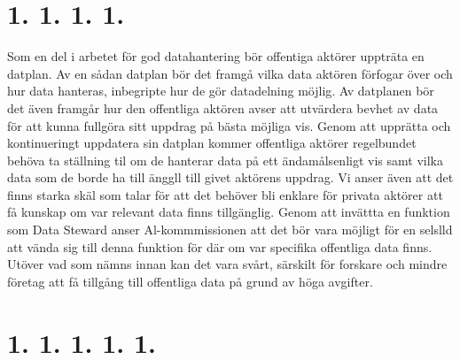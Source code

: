 {{{{{{{\section*{1. 1. 1. 1.}
Som en del i arbetet för god datahantering bör offentiga aktörer uppträta en datplan. Av en sådan datplan bör det framgå vilka data aktören förfogar över och hur data hanteras, inbegripte hur de gör datadelning möjlig. Av datplanen bör det även framgår hur den offentliga aktören avser att utvärdera bevhet av data för att kunna fullgöra sitt uppdrag på bästa möjliga vis. Genom att upprätta och kontinueringt uppdatera sin datplan kommer offentliga aktörer regelbundet behöva ta ställning til om de hanterar data på ett ändamålsenligt vis samt vilka data som de borde ha till änggll till givet aktörens uppdrag.
Vi anser även att det finns starka skäl som talar för att det behöver bli enklare för privata aktörer att få kunskap om var relevant data finns tillgänglig. Genom att invättta en funktion som Data Steward anser Al-kommmissionen att det bör vara möjligt för en selslld att vända sig till denna funktion för där om var specifika offentliga data finns. Utöver vad som nämns innan kan det vara svårt, särskilt för forskare och mindre företag att få tillgång till offentliga data på grund av höga avgifter.
\section*{1. 1. 1. 1. 1.}
}}}}}}}
